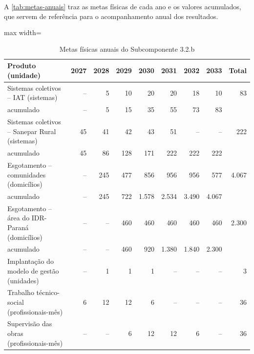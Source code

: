 A \autoref{tab:metas-anuais} traz as metas físicas de cada ano e os valores
acumulados, que servem de referência para o acompanhamento anual dos
resultados.

\begin{table}[H]
\centering
\caption{Metas físicas anuais do Subcomponente 3.2.b}
\label{tab:metas-anuais}
\footnotesize
\renewcommand{\arraystretch}{1.2}
\begin{adjustbox}{max width=\linewidth}
\begin{tabular}{lrrrrrrrr}
\toprule
\textbf{Produto (unidade)} & \textbf{2027} & \textbf{2028} & \textbf{2029} &
\textbf{2030} & \textbf{2031} & \textbf{2032} & \textbf{2033} & \textbf{Total} \\
\midrule
Sistemas coletivos -- IAT (sistemas) & -- & 5 & 10 & 20 & 20 & 18 & 10 & 83 \\
\quad acumulado & -- & 5 & 15 & 35 & 55 & 73 & 83 & \\
Sistemas coletivos -- Sanepar Rural (sistemas) & 45 & 41 & 42 & 43 & 51 & -- & -- & 222 \\
\quad acumulado & 45 & 86 & 128 & 171 & 222 & 222 & 222 & \\
Esgotamento -- comunidades (domicílios) & -- & 245 & 477 & 856 & 956 & 956 & 577 & 4.067 \\
\quad acumulado & -- & 245 & 722 & 1.578 & 2.534 & 3.490 & 4.067 & \\
Esgotamento -- área do IDR-Paraná (domicílios) & -- & -- & 460 & 460 & 460 & 460 & 460 & 2.300 \\
\quad acumulado & -- & -- & 460 & 920 & 1.380 & 1.840 & 2.300 & \\
Implantação do modelo de gestão (unidades) & -- & 1 & 1 & 1 & -- & -- & -- & 3 \\
Trabalho técnico-social (profissionais-mês) & 6 & 12 & 12 & 6 & -- & -- & -- & 36 \\
Supervisão das obras (profissionais-mês) & -- & -- & 6 & 12 & 12 & 6 & -- & 36 \\
\bottomrule
\end{tabular}
\end{adjustbox}
\end{table}

\FloatBarrier

\postextual


